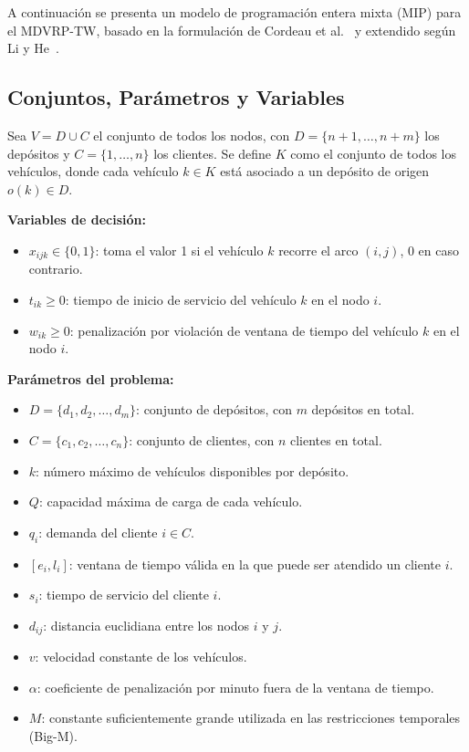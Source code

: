 \documentclass[letter, 10pt, dvipdfmx]{article}
\begin{document}
A continuación se presenta un modelo de programación entera mixta (MIP) para el MDVRP-TW, basado en la formulación de Cordeau et al.~\cite{Cordeau2001} y extendido según Li y He~\cite{Li2024}.

\subsection{Conjuntos, Parámetros y Variables}

Sea $V = D \cup C$ el conjunto de todos los nodos, con $D = \{n+1, \ldots, n+m\}$ los depósitos y $C = \{1, \ldots, n\}$ los clientes. Se define $K$ como el conjunto de todos los vehículos, donde cada vehículo $k \in K$ está asociado a un depósito de origen $o(k) \in D$.

\textbf{Variables de decisión:}
\begin{itemize}
  \item $x_{ijk} \in \{0,1\}$: toma el valor 1 si el vehículo $k$ recorre el arco $(i,j)$, 0 en caso contrario.
  \item $t_{ik} \geq 0$: tiempo de inicio de servicio del vehículo $k$ en el nodo $i$.
  \item $w_{ik} \geq 0$: penalización por violación de ventana de tiempo del vehículo $k$ en el nodo $i$.
\end{itemize}

\textbf{Parámetros del problema:}
\begin{itemize}
  \item $D = \{d_1, d_2, \ldots, d_m\}$: conjunto de depósitos, con $m$ depósitos en total.
  \item $C = \{c_1, c_2, \ldots, c_n\}$: conjunto de clientes, con $n$ clientes en total.
  \item $k$: número máximo de vehículos disponibles por depósito.
  \item $Q$: capacidad máxima de carga de cada vehículo.
  \item $q_i$: demanda del cliente $i \in C$.
  \item $[e_i, l_i]$: ventana de tiempo válida en la que puede ser atendido un cliente $i$.
  \item $s_i$: tiempo de servicio del cliente $i$.
  \item $d_{ij}$: distancia euclidiana entre los nodos $i$ y $j$.
  \item $v$: velocidad constante de los vehículos.
  \item $\alpha$: coeficiente de penalización por minuto fuera de la ventana de tiempo.
  \item $M$: constante suficientemente grande utilizada en las restricciones temporales (Big-M).
\end{itemize}
\end{document}
